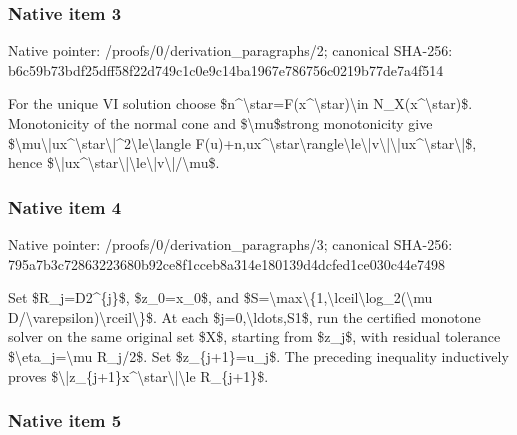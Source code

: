 \documentclass[10pt,a4paper]{article}
\begin{document}
\subsubsection{Native item 3}


Native pointer: /proofs/0/derivation\_paragraphs/2; canonical SHA-256: b6c59b73bdf25dff58f22d74\allowbreak{}9c1c0e9c14ba1967e786756c\allowbreak{}0219b77de7a4f514


For the unique VI solution choose \$n\textasciicircum{}\textbackslash{}star=F(x\textasciicircum{}\textbackslash{}star)\textbackslash{}in N\_X(x\textasciicircum{}\textbackslash{}star)\$. Monotonicity of the normal cone and \$\textbackslash{}mu\$strong monotonicity give \$\textbackslash{}mu\textbackslash{}|ux\textasciicircum{}\textbackslash{}star\textbackslash{}|\textasciicircum{}2\textbackslash{}le\textbackslash{}langle F(u)+n,ux\textasciicircum{}\textbackslash{}star\textbackslash{}rangle\textbackslash{}\allowbreak{}le\textbackslash{}|v\textbackslash{}|\textbackslash{}|ux\textasciicircum{}\textbackslash{}star\textbackslash{}|\$, hence \$\textbackslash{}|ux\textasciicircum{}\textbackslash{}star\textbackslash{}|\textbackslash{}le\textbackslash{}|v\textbackslash{}|/\textbackslash{}mu\$.


\subsubsection{Native item 4}


Native pointer: /proofs/0/derivation\_paragraphs/3; canonical SHA-256: 795a7b3c72863223680b92ce\allowbreak{}8f1cceb8a314e180139d4dcf\allowbreak{}ed1ce030c44e7498


Set \$R\_j=D2\textasciicircum{}\{j\}\$, \$z\_0=x\_0\$, and \$S=\textbackslash{}max\textbackslash{}\{1,\textbackslash{}lceil\textbackslash{}log\_2(\textbackslash{}mu D/\textbackslash{}varepsilon)\textbackslash{}rceil\textbackslash{}\}\$. At each \$j=0,\textbackslash{}ldots,S1\$, run the certified monotone solver on the same original set \$X\$, starting from \$z\_j\$, with residual tolerance \$\textbackslash{}eta\_j=\textbackslash{}mu R\_j/2\$. Set \$z\_\{j+1\}=u\_j\$. The preceding inequality inductively proves \$\textbackslash{}|z\_\{j+1\}x\textasciicircum{}\textbackslash{}star\textbackslash{}|\textbackslash{}le R\_\{j+1\}\$.


\subsubsection{Native item 5}
\end{document}
